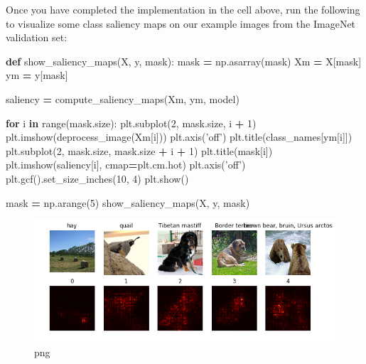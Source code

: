 \documentclass[]{book}
\newenvironment{Shaded}{\begin{snugshade}}{\end{snugshade}}
\newcommand{\KeywordTok}[1]{\textcolor[rgb]{0.13,0.29,0.53}{\textbf{#1}}}
\newcommand{\DecValTok}[1]{\textcolor[rgb]{0.00,0.00,0.81}{#1}}
\newcommand{\StringTok}[1]{\textcolor[rgb]{0.31,0.60,0.02}{#1}}
\newcommand{\ControlFlowTok}[1]{\textcolor[rgb]{0.13,0.29,0.53}{\textbf{#1}}}
\newcommand{\OperatorTok}[1]{\textcolor[rgb]{0.81,0.36,0.00}{\textbf{#1}}}
\newcommand{\BuiltInTok}[1]{#1}
\newcommand{\NormalTok}[1]{#1}
\theoremstyle{definition}
\theoremstyle{definition}
\theoremstyle{definition}
\theoremstyle{remark}
\begin{document}
Once you have completed the implementation in the cell above, run the
following to visualize some class saliency maps on our example images
from the ImageNet validation set:

\begin{Shaded}
\begin{Highlighting}[]
\KeywordTok{def}\NormalTok{ show_saliency_maps(X, y, mask):}
\NormalTok{    mask }\OperatorTok{=}\NormalTok{ np.asarray(mask)}
\NormalTok{    Xm }\OperatorTok{=}\NormalTok{ X[mask]}
\NormalTok{    ym }\OperatorTok{=}\NormalTok{ y[mask]}

\NormalTok{    saliency }\OperatorTok{=}\NormalTok{ compute_saliency_maps(Xm, ym, model)}

    \ControlFlowTok{for}\NormalTok{ i }\KeywordTok{in} \BuiltInTok{range}\NormalTok{(mask.size):}
\NormalTok{        plt.subplot(}\DecValTok{2}\NormalTok{, mask.size, i }\OperatorTok{+} \DecValTok{1}\NormalTok{)}
\NormalTok{        plt.imshow(deprocess_image(Xm[i]))}
\NormalTok{        plt.axis(}\StringTok{'off'}\NormalTok{)}
\NormalTok{        plt.title(class_names[ym[i]])}
\NormalTok{        plt.subplot(}\DecValTok{2}\NormalTok{, mask.size, mask.size }\OperatorTok{+}\NormalTok{ i }\OperatorTok{+} \DecValTok{1}\NormalTok{)}
\NormalTok{        plt.title(mask[i])}
\NormalTok{        plt.imshow(saliency[i], cmap}\OperatorTok{=}\NormalTok{plt.cm.hot)}
\NormalTok{        plt.axis(}\StringTok{'off'}\NormalTok{)}
\NormalTok{        plt.gcf().set_size_inches(}\DecValTok{10}\NormalTok{, }\DecValTok{4}\NormalTok{)}
\NormalTok{    plt.show()}

\NormalTok{mask }\OperatorTok{=}\NormalTok{ np.arange(}\DecValTok{5}\NormalTok{)}
\NormalTok{show_saliency_maps(X, y, mask)}
\end{Highlighting}
\end{Shaded}

\begin{figure}
\centering
\includegraphics{Network-Visualization-TensorFlow_files/Network-Visualization-TensorFlow_13_0.png}
\caption{png}
\end{figure}
\end{document}
